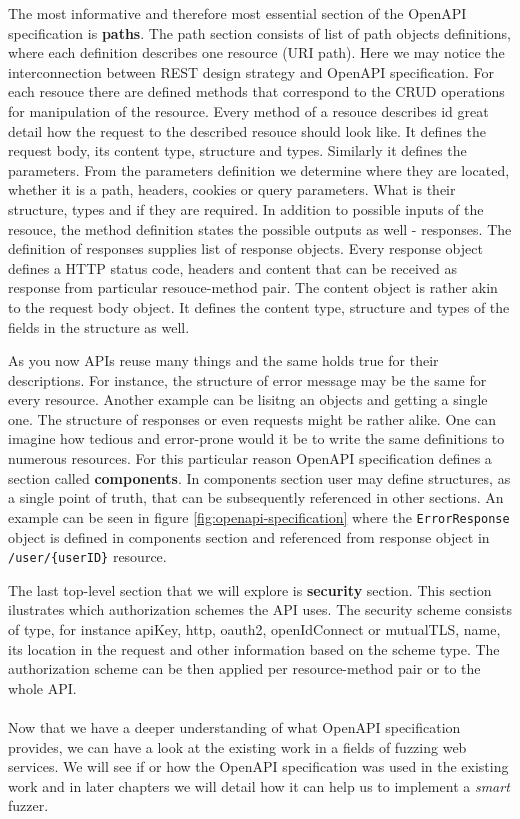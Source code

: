 The most informative and therefore most essential section of the OpenAPI specification is \textbf{paths}. The path section consists of list of path objects definitions, where each definition describes one resource (URI path). Here we may notice the interconnection between REST design strategy and OpenAPI specification. For each resouce there are defined methods that correspond to the CRUD operations for manipulation of the resource. Every method of a resouce describes id great detail how the request to the described resouce should look like. It defines the request body, its content type, structure and types. Similarly it defines the parameters. From the parameters definition we determine where they are located, whether it is a path, headers, cookies or query parameters. What is their structure, types and if they are required. In addition to possible inputs of the resouce, the method definition states the possible outputs as well - responses. The definition of responses supplies list of response objects. Every response object defines a HTTP status code, headers and content that can be received as response from particular resouce-method pair. The content object is rather akin to the request body object. It defines the content type, structure and types of the fields in the structure as well.

As you now APIs reuse many things and the same holds true for their descriptions. For instance, the structure of error message may be the same for every resource. Another example can be lisitng an objects and getting a single one. The structure of responses or even requests might be rather alike. One can imagine how tedious and error-prone would it be to write the same definitions to numerous resources. For this particular reason OpenAPI specification defines a section called \textbf{components}. In components section user may define structures, as a single point of truth, that can be subsequently referenced in other sections. An example can be seen in figure \ref{fig:openapi-specification} where the \texttt{ErrorResponse} object is defined in components section and referenced from response object in \texttt{/user/\{userID\}} resource.

The last top-level section that we will explore is \textbf{security} section. This section ilustrates which authorization schemes the API uses. The security scheme consists of type, for instance apiKey, http, oauth2, openIdConnect or mutualTLS, name, its location in the request and other information based on the scheme type. The authorization scheme can be then applied per resource-method pair or to the whole API.


\paragraph{}
Now that we have a deeper understanding of what OpenAPI specification provides, we can have a look at the existing work in a fields of fuzzing web services. We will see if or how the OpenAPI specification was used in the existing work and in later chapters we will detail how it can help us to implement a \emph{smart} fuzzer.
